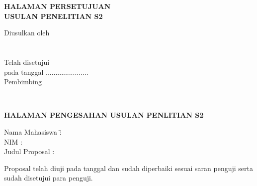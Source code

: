 \newpage
\begin{center}
\begin{singlespace}
\MakeUppercase{\normalfont\large\bfseries\expandafter{HALAMAN PERSETUJUAN}}\\

\vspace{1.0cm}
\MakeUppercase{\normalfont\bfseries\expandafter{USULAN PENELITIAN S2}}\\

\vspace{0.5cm}
\MakeUppercase{\normalfont\bfseries\@titleind}\par\nobreak
{\normalfont\bfseries\@subtitleind}\par\nobreak

\vspace{3.0cm}
Diusulkan oleh\\

\vspace{3cm}
\underline{\@fullname}\\
\@idnum\\

\vspace{4cm}
Telah disetujui\\
pada tanggal ...................... \@yearsubmit \\ [.5cm]
Pembimbing

\vspace{1.5cm}
\underline{\@firstsupervisor}\\			
\@firstsupervisornip
\end{singlespace}
\end{center}

\newpage
\begin{center}
\MakeUppercase{\normalfont\large\bfseries\expandafter{HALAMAN PENGESAHAN USULAN PENLITIAN S2}}
\end{center}

\vspace{1.0cm}
\begin{tabbing}
Nama Mahasiswa 	\= : \@fullname \\ [0.2cm]
NIM				\> : \@idnum \\ [0.2cm]
Judul Proposal 	\> : \@titleind
\end{tabbing}
	
\vspace{0.5cm}
\noindent
Proposal telah diuji pada tanggal \@examdate \space dan sudah diperbaiki sesuai saran penguji serta sudah disetujui para penguji.

